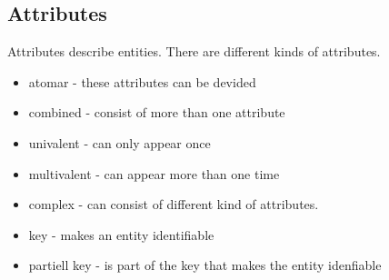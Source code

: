 \subsection{Attributes}
Attributes describe entities. There are different kinds of attributes.
\begin{itemize}
\setlength{\itemsep}{1pt}
	\item atomar - these attributes can be devided
	\item combined - consist of more than one attribute
	\item univalent - can only appear once
	\item multivalent - can appear more than one time
	\item complex - can consist of different kind of attributes.
	\item key - makes an entity identifiable
	\item partiell key - is part of the key that makes the entity idenfiable
\end{itemize}

